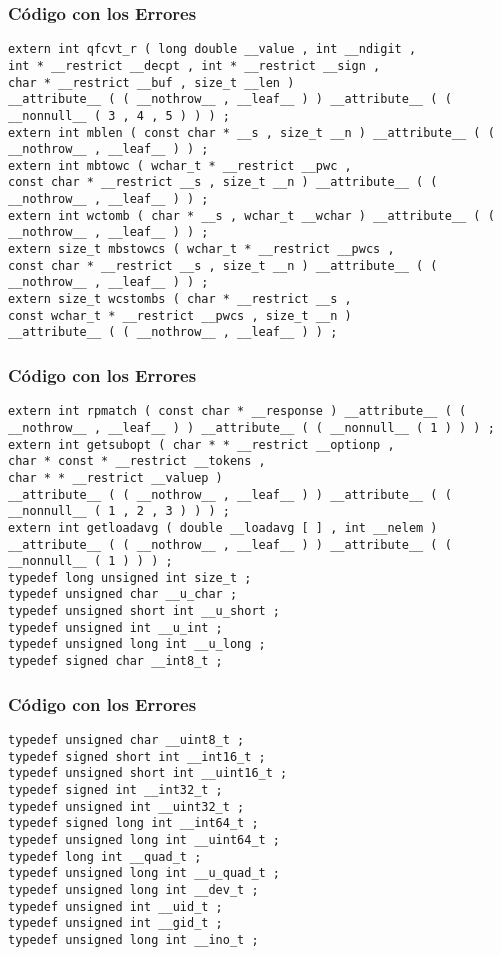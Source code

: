 \documentclass{beamer}
\begin{document}
\begin{frame}[fragile]
\frametitle{C\'odigo con los Errores}
\begin{lstlisting}[style=CStyle]
extern int qfcvt_r ( long double __value , int __ndigit , 
int * __restrict __decpt , int * __restrict __sign , 
char * __restrict __buf , size_t __len ) 
__attribute__ ( ( __nothrow__ , __leaf__ ) ) __attribute__ ( ( __nonnull__ ( 3 , 4 , 5 ) ) ) ; 
extern int mblen ( const char * __s , size_t __n ) __attribute__ ( ( __nothrow__ , __leaf__ ) ) ; 
extern int mbtowc ( wchar_t * __restrict __pwc , 
const char * __restrict __s , size_t __n ) __attribute__ ( ( __nothrow__ , __leaf__ ) ) ; 
extern int wctomb ( char * __s , wchar_t __wchar ) __attribute__ ( ( __nothrow__ , __leaf__ ) ) ; 
extern size_t mbstowcs ( wchar_t * __restrict __pwcs , 
const char * __restrict __s , size_t __n ) __attribute__ ( ( __nothrow__ , __leaf__ ) ) ; 
extern size_t wcstombs ( char * __restrict __s , 
const wchar_t * __restrict __pwcs , size_t __n ) 
__attribute__ ( ( __nothrow__ , __leaf__ ) ) ; 
\end{lstlisting}
\end{frame}
\begin{frame}[fragile]
\frametitle{C\'odigo con los Errores}
\begin{lstlisting}[style=CStyle]
extern int rpmatch ( const char * __response ) __attribute__ ( ( __nothrow__ , __leaf__ ) ) __attribute__ ( ( __nonnull__ ( 1 ) ) ) ; 
extern int getsubopt ( char * * __restrict __optionp , 
char * const * __restrict __tokens , 
char * * __restrict __valuep ) 
__attribute__ ( ( __nothrow__ , __leaf__ ) ) __attribute__ ( ( __nonnull__ ( 1 , 2 , 3 ) ) ) ; 
extern int getloadavg ( double __loadavg [ ] , int __nelem ) 
__attribute__ ( ( __nothrow__ , __leaf__ ) ) __attribute__ ( ( __nonnull__ ( 1 ) ) ) ; 
typedef long unsigned int size_t ; 
typedef unsigned char __u_char ; 
typedef unsigned short int __u_short ; 
typedef unsigned int __u_int ; 
typedef unsigned long int __u_long ; 
typedef signed char __int8_t ; 
\end{lstlisting}
\end{frame}
\begin{frame}[fragile]
\frametitle{C\'odigo con los Errores}
\begin{lstlisting}[style=CStyle]
typedef unsigned char __uint8_t ; 
typedef signed short int __int16_t ; 
typedef unsigned short int __uint16_t ; 
typedef signed int __int32_t ; 
typedef unsigned int __uint32_t ; 
typedef signed long int __int64_t ; 
typedef unsigned long int __uint64_t ; 
typedef long int __quad_t ; 
typedef unsigned long int __u_quad_t ; 
typedef unsigned long int __dev_t ; 
typedef unsigned int __uid_t ; 
typedef unsigned int __gid_t ; 
typedef unsigned long int __ino_t ; 
\end{lstlisting}
\end{frame}
\end{document}
